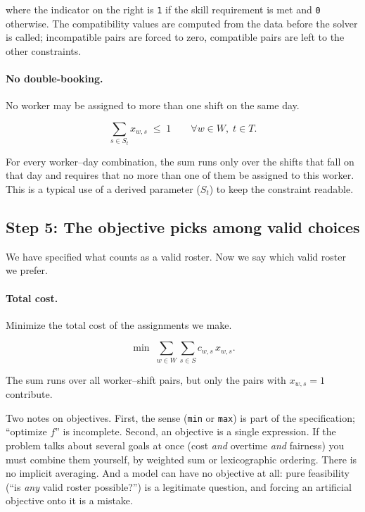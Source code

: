 where the indicator on the right is \lstinline!1! if the
skill requirement is met and \lstinline!0! otherwise. The
compatibility values are computed from the data before the solver is
called; incompatible pairs are forced to zero, compatible pairs are left
to the other constraints.

\paragraph{No double-booking.} No worker may be assigned to more than one
shift on the same day.

\[
\sum_{s \in S_t} x_{w,s} \;\le\; 1 \qquad \forall w \in W, \; t \in T.
\]

For every worker--day combination, the sum runs only over the shifts
that fall on that day and requires that no more than one of them be
assigned to this worker. This is a typical use of a derived parameter
(\(S_t\)) to keep the constraint readable.

\subsection{Step 5: The objective picks among valid choices}\label{step-5-the-objective-picks-among-valid-choices}

We have specified what counts as a valid roster. Now we say which valid
roster we prefer.

\paragraph{Total cost.} Minimize the total cost of the assignments we make.

\[
\min \;\sum_{w \in W} \sum_{s \in S} c_{w,s} \, x_{w,s}.
\]

The sum runs over all worker--shift pairs, but only the pairs with
\(x_{w,s} = 1\) contribute.

Two notes on objectives. First, the sense
(\lstinline!min! or \lstinline!max!) is
part of the specification; ``optimize \(f\)'' is incomplete. Second, an
objective is a single expression. If the problem talks about several
goals at once (cost \emph{and} overtime \emph{and} fairness) you
must combine them yourself, by weighted sum or lexicographic ordering.
There is no implicit averaging. And a model can have no objective at
all: pure feasibility (``is \emph{any} valid roster possible?'') is a
legitimate question, and forcing an artificial objective onto it is a
mistake.
